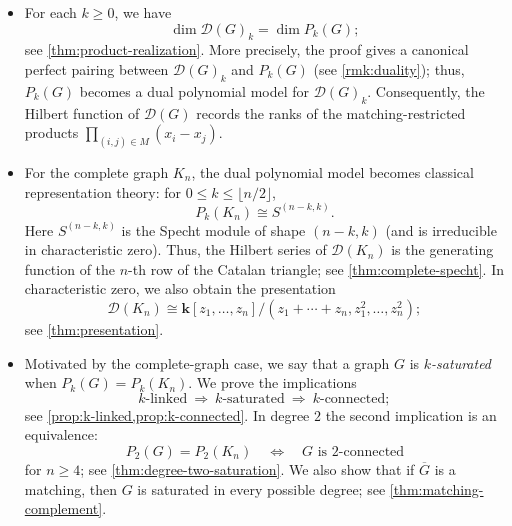 \documentclass[12pt]{amsart}
\theoremstyle{definition}
\theoremstyle{remark}
\newcommand{\kk}{\mathbf{k}}
\begin{document}
\begin{itemize}
\item
For each $k \geq 0$, we have
\[
  \dim \mathcal D(G)_k=\dim P_k(G);
\]
see \cref{thm:product-realization}.
More precisely, the proof gives a canonical perfect pairing between
$\mathcal D(G)_k$ and $P_k(G)$
(see \cref{rmk:duality});
thus, $P_k(G)$ becomes a dual polynomial model for
$\mathcal D(G)_k$.
Consequently, the Hilbert function of $\mathcal D(G)$ records the ranks of the
matching-restricted products $\prod_{(i,j)\in M}(x_i-x_j)$.

\item
For the complete graph $K_n$, the dual polynomial model becomes classical
representation theory: for $0\leq k\leq\lfloor n/2\rfloor$,
\[
  P_k(K_n)\cong S^{(n-k,k)}.
\]
Here $S^{(n-k,k)}$ is the Specht module of shape $(n-k,k)$
(and is irreducible in characteristic zero).
Thus, the Hilbert series of $\mathcal D(K_n)$ is the
generating function of the $n$-th row of the Catalan triangle; see
\cref{thm:complete-specht}.  In characteristic zero, we also obtain the
presentation
\[
 \mathcal D(K_n)\cong
 \kk[z_1,\ldots,z_n]/
 (z_1+\cdots+z_n,z_1^2,\ldots,z_n^2);
\]
see \cref{thm:presentation}.

\item
Motivated by the complete-graph case, we say that a graph $G$
is \emph{$k$-saturated} when $P_k(G)=P_k(K_n)$.  We prove the implications
\[
 k\text{-linked}
 \ \Longrightarrow\
 k\text{-saturated}
 \ \Longrightarrow\
 k\text{-connected};
\]
see \cref{prop:k-linked,prop:k-connected}.  In degree $2$ the second
implication is an equivalence:
\[
 P_2(G)=P_2(K_n)
 \quad\Longleftrightarrow\quad
 G\text{ is $2$-connected}
\]
for $n\ge4$; see \cref{thm:degree-two-saturation}.  We also show that if
$\overline G$ is a matching, then $G$ is saturated in every possible degree;
see \cref{thm:matching-complement}.


\end{itemize}
\end{document}
